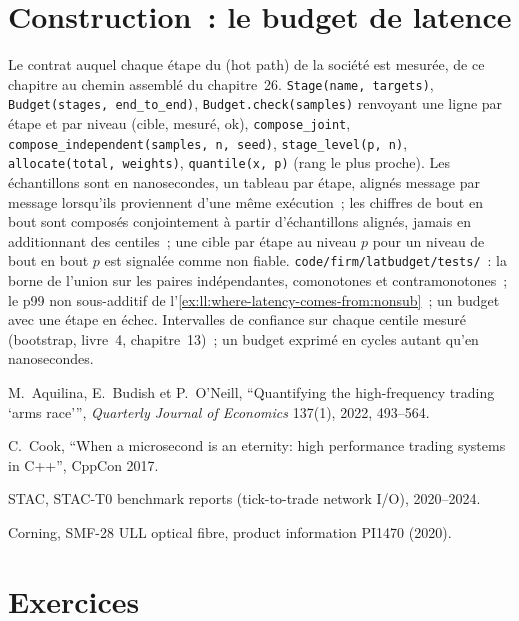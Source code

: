 \section{Construction~: le budget de latence}\label{bld:ll:where-latency-comes-from:latbudget}

\begin{build}
 Le contrat auquel chaque étape du  (hot path) de la société est mesurée, de ce chapitre au
chemin assemblé du chapitre~26.
 \texttt{Stage(name, targets)}, \texttt{Budget(stages, end\_to\_end)},
\texttt{Budget.check(samples)} renvoyant une ligne par étape et par niveau (cible, mesuré, ok),
\texttt{compose\_joint}, \texttt{compose\_independent(samples, n, seed)}, \texttt{stage\_level(p, n)},
\texttt{allocate(total, weights)}, \texttt{quantile(x, p)} (rang le plus proche).
 Les échantillons sont en nanosecondes, un tableau par étape, alignés message par message lorsqu'ils proviennent d'une même exécution~;
les chiffres de bout en bout sont composés conjointement à partir d'échantillons alignés, jamais en additionnant des centiles~; une cible par étape au niveau
$p$ pour un niveau de bout en bout $p$ est signalée comme non fiable.
 \texttt{code/firm/latbudget/tests/}~: la borne de l'union sur les paires indépendantes, comonotones et
contramonotones~; le p99 non sous-additif de l'\cref{ex:ll:where-latency-comes-from:nonsub}~; un budget avec une
étape en échec.
 Intervalles de confiance sur chaque centile mesuré (bootstrap, livre~4, chapitre~13)~; un
budget exprimé en cycles autant qu'en nanosecondes.
\end{build}

\begin{omsources}
\item M.~Aquilina, E.~Budish et P.~O'Neill, ``Quantifying the high-frequency trading `arms race''', \emph{Quarterly
Journal of Economics} 137(1), 2022, 493--564.
\item C.~Cook, ``When a microsecond is an eternity: high performance trading systems in C++'', CppCon 2017.
\item STAC, STAC-T0 benchmark reports (tick-to-trade network I/O), 2020--2024.
\item Corning, SMF-28 ULL optical fibre, product information PI1470 (2020).
\end{omsources}

\section{Exercices}

